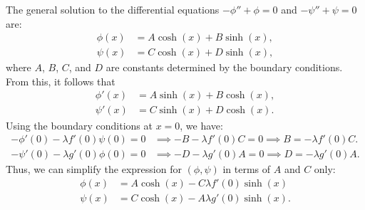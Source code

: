 \documentclass[12pt, reqno]{amsart}
\numberwithin{equation}{section}
\begin{document}
The general solution to the differential equations \(-\phi'' + \phi = 0\) and \(-\psi'' + \psi = 0\) are:
\begin{align*}
    \phi(x) &= A \cosh(x) + B \sinh(x), \\
    \psi(x) &= C \cosh(x) + D \sinh(x),
\end{align*}
where \(A\), \(B\), \(C\), and \(D\) are constants determined by the boundary conditions. From this, it follows that
\begin{align*}
    \phi'(x) &= A \sinh(x) + B \cosh(x) , \\
    \psi'(x) &= C \sinh(x) + D \cosh(x).
\end{align*}
Using the boundary conditions at \(x = 0\), we have:
\begin{align*}
    -\phi'(0) - \lambda f'(0) \psi(0) = 0
        &\implies -B - \lambda f'(0) C = 0 
        \implies B = -\lambda f'(0) C. \\
    -\psi'(0) - \lambda g'(0) \phi(0) = 0 
        &\implies -D - \lambda g'(0) A = 0 
        \implies D = -\lambda g'(0) A.
\end{align*}
Thus, we can simplify the expression for  $(\phi, \psi)$ in terms of $A$ and $C$ only:
\begin{subequations}\label{sys_eigenfunctionsAC}
\begin{align}
    \phi(x) &= A \cosh(x) - C \lambda f'(0) \sinh(x) \\
    \psi(x) &= C \cosh(x) - A \lambda g'(0) \sinh(x).
\end{align}
\end{subequations}

\end{document}
